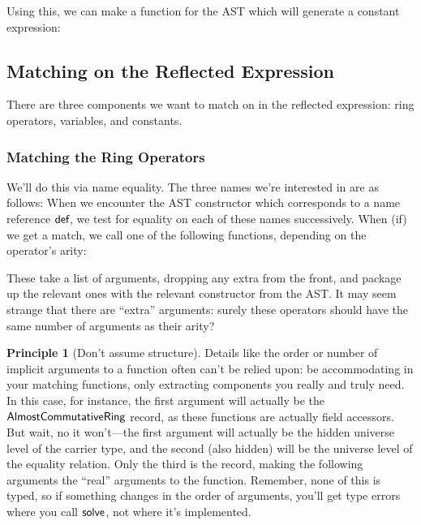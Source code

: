 \documentclass[draft, twocolumn]{article}
\theoremstyle{definition}
\theoremstyle{definition}
\newtheorem{principle}{Principle}[section]
\begin{document}
Using this, we can make a function for the AST which will generate a constant
expression:
\subsection{Matching on the Reflected Expression}
There are three components we want to match on in the reflected expression: ring
operators, variables, and constants.
\subsubsection{Matching the Ring Operators}
We'll do this via name equality. The three names we're interested in are as
follows:
When we encounter the AST constructor which corresponds to a name reference
\(\AgdaInductiveConstructor{def}\), we test for equality on each of these names
successively. When (if) we get a match, we call one of the following functions,
depending on the operator's arity:

These take a list of arguments, dropping any extra from the front, and package
up the relevant ones with the relevant constructor from the AST. It may seem
strange that there are ``extra'' arguments: surely these operators should have
the same number of arguments as their arity?

\begin{principle}[Don't assume structure]
  Details like the order or number of implicit arguments to a function often
  can't be relied upon: be accommodating in your matching functions, only
  extracting components you really and truly need. In this case, for instance,
  the first argument will actually be the
  \(\AgdaDatatype{AlmostCommutativeRing}\) record, as these functions are
  actually field accessors. But wait, no it won't---the first argument will
  actually be the hidden universe level of the carrier type, and the second
  (also hidden) will be the universe level of the equality relation. Only the
  third is the record, making the following arguments the ``real'' arguments to
  the function. Remember, none of this is typed, so if something changes in the
  order of arguments, you'll get type errors where you call
  \(\AgdaMacro{solve}\), not where it's implemented.
\end{principle}
\end{document}
